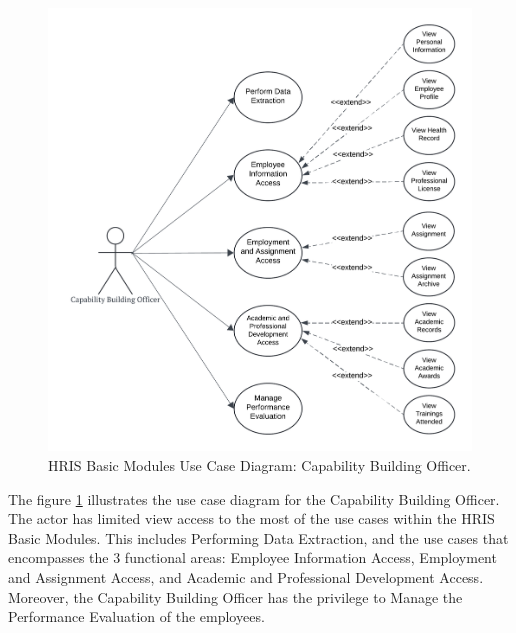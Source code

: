    \begin{figure}[H]
        \centering
        \includegraphics[width=0.9\linewidth]{figures/images/use-case-basic-7.png}
        \caption{HRIS Basic Modules Use Case Diagram: Capability Building Officer.}
        \label{fig:use-case-basic-7}
    \end{figure}

    The figure \ref{fig:use-case-basic-7} illustrates the use case diagram for the Capability Building Officer. The actor has limited view access to the most of the use cases within the HRIS Basic Modules. This includes Performing Data Extraction, and the use cases that  encompasses the 3 functional areas: Employee Information Access, Employment and Assignment Access, and Academic and Professional Development Access. Moreover, the Capability Building Officer has the privilege to Manage the Performance Evaluation of the employees.

